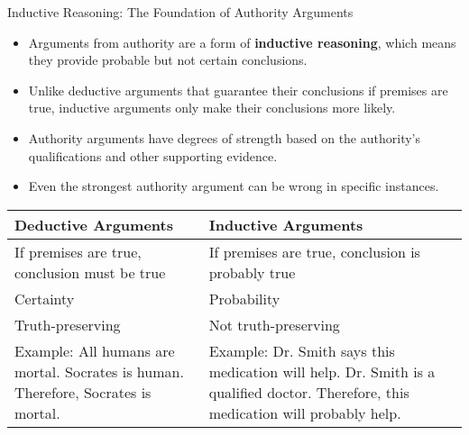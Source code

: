 \documentclass{beamer}
\begin{document}
\begin{frame}{Inductive Reasoning: The Foundation of Authority Arguments}
    \begin{itemize}
        \item Arguments from authority are a form of \textbf{inductive reasoning}, which means they provide probable but not certain conclusions.
        \item Unlike deductive arguments that guarantee their conclusions if premises are true, inductive arguments only make their conclusions more likely.
        \item Authority arguments have degrees of strength based on the authority's qualifications and other supporting evidence.
        \item Even the strongest authority argument can be wrong in specific instances.
    \end{itemize}
    
    \begin{table}
        \scriptsize
        \centering
        \begin{tabular}{|p{5cm}|p{5cm}|}
            \hline
            \textbf{Deductive Arguments} & \textbf{Inductive Arguments} \\
            \hline
            If premises are true, conclusion must be true & If premises are true, conclusion is probably true \\
            Certainty & Probability \\
            Truth-preserving & Not truth-preserving \\
            Example: All humans are mortal. Socrates is human. Therefore, Socrates is mortal. & Example: Dr. Smith says this medication will help. Dr. Smith is a qualified doctor. Therefore, this medication will probably help. \\
            \hline
        \end{tabular}
    \end{table}
\end{frame}
\end{document}
